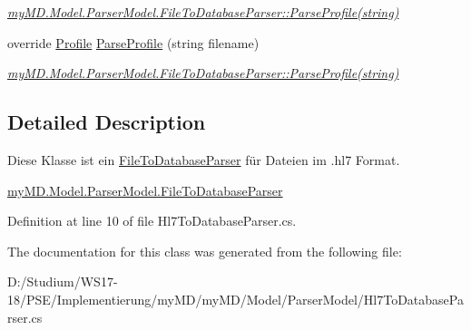 \begin{CompactItemize}
\begin{CompactList}\small\item\em \hyperlink{classmy_m_d_1_1_model_1_1_parser_model_1_1_file_to_database_parser_3bb98e867ab361116982cfb17dfe8de9}{my\-MD.Model.Parser\-Model.File\-To\-Database\-Parser::Parse\-Profile(string)} \item\end{CompactList}\item 
\hypertarget{classmy_m_d_1_1_model_1_1_parser_model_1_1_hl7_to_database_parser_3bb98e867ab361116982cfb17dfe8de9}{
override \hyperlink{classmy_m_d_1_1_model_1_1_data_model_1_1_profile}{Profile} \hyperlink{classmy_m_d_1_1_model_1_1_parser_model_1_1_hl7_to_database_parser_3bb98e867ab361116982cfb17dfe8de9}{Parse\-Profile} (string filename)}
\label{d5/d92/classmy_m_d_1_1_model_1_1_parser_model_1_1_hl7_to_database_parser_3bb98e867ab361116982cfb17dfe8de9}

\begin{CompactList}\small\item\em \hyperlink{classmy_m_d_1_1_model_1_1_parser_model_1_1_file_to_database_parser_3bb98e867ab361116982cfb17dfe8de9}{my\-MD.Model.Parser\-Model.File\-To\-Database\-Parser::Parse\-Profile(string)} \item\end{CompactList}\end{CompactItemize}


\subsection{Detailed Description}
Diese Klasse ist ein \hyperlink{classmy_m_d_1_1_model_1_1_parser_model_1_1_file_to_database_parser}{File\-To\-Database\-Parser} f\"{u}r Dateien im .hl7 Format. 

\hyperlink{classmy_m_d_1_1_model_1_1_parser_model_1_1_file_to_database_parser}{my\-MD.Model.Parser\-Model.File\-To\-Database\-Parser} 



Definition at line 10 of file Hl7To\-Database\-Parser.cs.

The documentation for this class was generated from the following file:\begin{CompactItemize}
\item 
D:/Studium/WS17-18/PSE/Implementierung/my\-MD/my\-MD/Model/Parser\-Model/Hl7To\-Database\-Parser.cs\end{CompactItemize}
